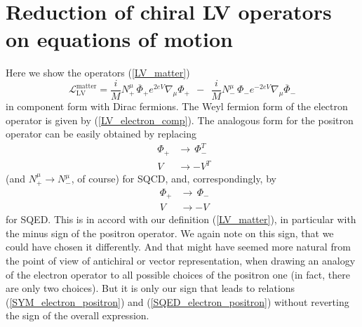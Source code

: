 \documentclass[12pt]{revtex4}
\begin{document}

\section{Reduction of chiral LV operators on equations of motion}
\label{app_reduction}
Here we show the operators (\ref{LV_matter})
\[
\mathcal{L}_{\mathrm{LV}}^{\mathrm{matter}} = 
           \frac{i}{M} N_+^\mu\, \overline{\Phi}_+ e^{2eV} 
\nabla_\mu \Phi_+ 
~~
-~~ \frac{i}{M} N_-^\mu\, 
                          \Phi_- e^{-2eV} \nabla_\mu 
  \overline{\Phi}_-
\]
    in component form with Dirac fermions.
The Weyl fermion form of the electron operator
is given by (\ref{LV_electron_comp}). 
The analogous form for the positron operator can
be easily obtained by replacing
\begin{eqnarray}
\nonumber
& \Phi_+ & \to \,\Phi_-^T \\
\label{SYM_electron_positron}
& V      & \to - V^T~~
\end{eqnarray}
(and $ N_+^\mu \to N_-^\mu $, of course)
for SQCD, and, correspondingly, by
\begin{eqnarray}
\nonumber
& \Phi_+ & \to \,\Phi_- \\
\label{SQED_electron_positron}
& V      & \to - V~~
\end{eqnarray}
for SQED.
This is in accord with our definition (\ref{LV_matter}), in
particular with the minus sign of the positron operator.
We again note on this sign, that we could have chosen it
differently.
And that might have seemed more natural from the point
of view of antichiral or vector representation, when
drawing an analogy of the electron operator to 
all possible choices of the positron one (in fact,
there are only two choices).
But it is only our sign that leads to relations
(\ref{SYM_electron_positron}) and (\ref{SQED_electron_positron})
without reverting the sign of the overall expression.
\end{document}
